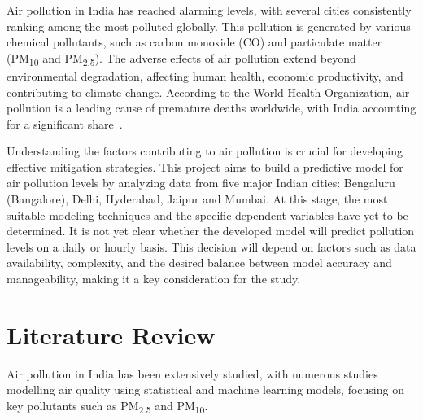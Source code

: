 \documentclass[12pt]{article}
\begin{document}
Air pollution in India has reached alarming levels, with several cities consistently ranking among the most polluted globally. This pollution is generated by various chemical pollutants, such as carbon monoxide (CO) and particulate matter (PM\textsubscript{10} and PM\textsubscript{2.5}). The adverse effects of air pollution extend beyond environmental degradation, affecting human health, economic productivity, and contributing to climate change. According to the World Health Organization, air pollution is a leading cause of premature deaths worldwide, with India accounting for a significant share~\cite{Dey2020}.

Understanding the factors contributing to air pollution is crucial for developing effective mitigation strategies. This project aims to build a predictive model for air pollution levels by analyzing data from five major Indian cities: Bengaluru (Bangalore), Delhi, Hyderabad, Jaipur and Mumbai. At this stage, the most suitable modeling techniques and the specific dependent variables have yet to be determined. It is not yet clear whether the developed model will predict pollution levels on a daily or hourly basis. This decision will depend on factors such as data availability, complexity, and the desired balance between model accuracy and manageability, making it a key consideration for the study.

\newpage




\section{Literature Review}

Air pollution in India has been extensively studied, with numerous studies modelling air quality using statistical and machine learning models, focusing on key pollutants such as PM\textsubscript{2.5} and PM\textsubscript{10}.


\end{document}
